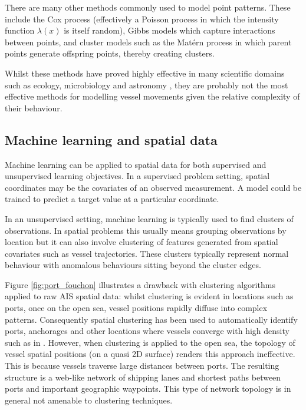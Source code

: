 \documentclass{mldsmsc}
\begin{document}
There are many other methods commonly used to model point patterns. These include the Cox process (effectively a Poisson process in which the intensity function \(\lambda(x)\) is itself random), Gibbs models which capture interactions between points, and cluster models such as the Mat\'{e}rn process in which parent points generate offspring points, thereby creating clusters. 

Whilst these methods have proved highly effective in many scientific domains such as ecology, microbiology and astronomy \citep{baddeley2015spatial}, they are probably not the most effective methods for modelling vessel movements given the relative complexity of their behaviour.


\subsection{Machine learning and spatial data}
Machine learning can be applied to spatial data for both supervised and unsupervised learning objectives. In a supervised problem setting, spatial coordinates may be the covariates of an observed measurement. A model could be trained to predict a target value at a particular coordinate.

In an unsupervised setting, machine learning is typically used to find clusters of observations. In spatial problems this usually means grouping observations by location but it can also involve clustering of features generated from spatial covariates such as vessel trajectories. These clusters typically represent normal behaviour with anomalous behaviours sitting beyond the cluster edges.

Figure \ref{fig:port_fouchon}  illustrates a drawback with clustering algorithms applied to raw AIS spatial data: whilst clustering is evident in locations such as ports, once on the open sea, vessel positions rapidly diffuse into complex patterns. Consequently spatial clustering has been used to automatically identify ports, anchorages and other locations where vessels converge with high density such as in \cite{wang_extracting_2019}. However, when clustering is applied to the open sea, the topology of vessel spatial positions (on a quasi 2D surface) renders this approach ineffective. This is because vessels traverse large distances between ports. The resulting structure is a web-like network of shipping lanes and shortest paths between ports and important geographic waypoints. This type of network topology is in general not amenable to clustering techniques.
\end{document}

